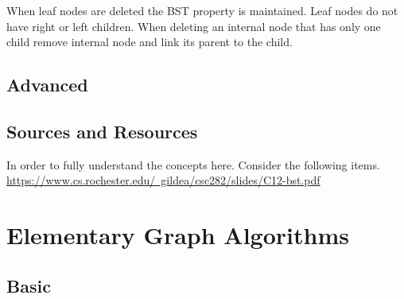 \documentclass[11pt,fleqn]{book}
\begin{document}
\begin{remark}
When leaf nodes are deleted the BST property is maintained. Leaf nodes do not have right or left children. When deleting an internal node that has only one child remove internal node and link its parent to the child.  
\end{remark}
\section{Advanced}
\section{Sources and Resources}
In order to fully understand the concepts here. Consider the following items. \\
\href{https://www.cs.rochester.edu/~gildea/csc282/slides/C12-bst.pdf}{https://www.cs.rochester.edu/~gildea/csc282/slides/C12-bst.pdf}
\chapter{Elementary Graph Algorithms} 
\section{Basic}
\vspace{1em}
\end{document}
